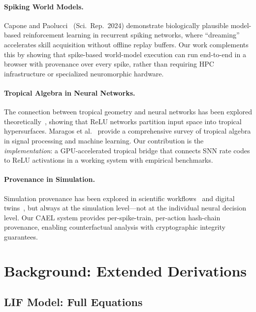 \documentclass[10pt]{article}
\newcommand{\cael}{CAEL}
\begin{document}
\paragraph{Spiking World Models.}
Capone and Paolucci~\cite{capone2024dreaming} (Sci.\ Rep.\ 2024) demonstrate
biologically plausible model-based reinforcement learning in recurrent spiking
networks, where ``dreaming'' accelerates skill acquisition without offline replay
buffers.
Our work complements this by showing that spike-based world-model execution can
run end-to-end in a browser with provenance over every spike, rather than
requiring HPC infrastructure or specialized neuromorphic hardware.

\paragraph{Tropical Algebra in Neural Networks.}
The connection between tropical geometry and neural networks has been explored
theoretically~\cite{zhang2018tropical, alfarra2022decision}, showing that ReLU
networks partition input space into tropical hypersurfaces.
Maragos et al.~\cite{maragos2021tropical} provide a comprehensive survey of
tropical algebra in signal processing and machine learning.
Our contribution is the \emph{implementation}: a GPU-accelerated tropical bridge
that connects SNN rate codes to ReLU activations in a working system with
empirical benchmarks.

\paragraph{Provenance in Simulation.}
Simulation provenance has been explored in scientific workflows~\cite{simmhan2005survey}
and digital twins~\cite{tao2019digital}, but always at the simulation level---not
at the individual neural decision level.
Our \cael{} system provides per-spike-train, per-action hash-chain provenance,
enabling counterfactual analysis with cryptographic integrity guarantees.

\section{Background: Extended Derivations}
\label{supp:background}

\subsection{LIF Model: Full Equations}
\end{document}
